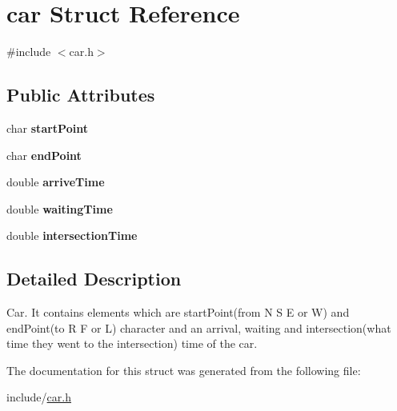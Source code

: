 \hypertarget{structcar}{}\section{car Struct Reference}
\label{structcar}


{\ttfamily \#include $<$car.\+h$>$}

\subsection*{Public Attributes}
\begin{DoxyCompactItemize}
\item 
\mbox{\label{structcar_afdace33d0ae17555243a877118e2465b}} 
char {\bfseries start\+Point}
\item 
\mbox{\label{structcar_a3a812ff6bba90e6e2910a719394edbe4}} 
char {\bfseries end\+Point}
\item 
\mbox{\label{structcar_a4f6248708f3fbfceb62255d49012e475}} 
double {\bfseries arrive\+Time}
\item 
\mbox{\label{structcar_a0953f79b8df43c03a181d4a7a85ea9cb}} 
double {\bfseries waiting\+Time}
\item 
\mbox{\label{structcar_a1722f9ad463d1b863161f6e6c220383d}} 
double {\bfseries intersection\+Time}
\end{DoxyCompactItemize}


\subsection{Detailed Description}
Car. It contains elements which are start\+Point(from N S E or W) and end\+Point(to R F or L) character and an arrival, waiting and intersection(what time they went to the intersection) time of the car. 

The documentation for this struct was generated from the following file\+:\begin{DoxyCompactItemize}
\item 
include/\hyperlink{car_8h}{car.\+h}\end{DoxyCompactItemize}
